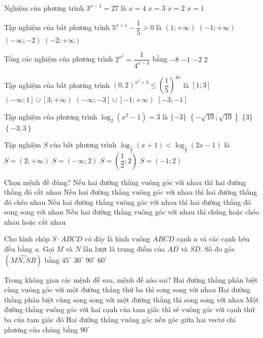 \begin{ex}
Nghiệm của phương trình ${3^{x-1}}=27$ là
\choice
{$x=4$}
{$x=3$}
{$x=2$}
{$x=1$}
\end{ex}
\begin{ex}
Tập nghiệm của bất phương trình ${5^{x+1}}-\dfrac{1}{5}>0$ là
\choice
{$\left(1;+\infty\right)$}
{$\left(-1;+\infty\right)$}
{$\left(-\infty ;-2\right)$}
{$\left(-2;+\infty\right)$}
\end{ex}
\begin{ex}
Tổng các nghiệm của phương trình ${2^{x^2}}=\dfrac{1}{{4^{x-4}}}$ bằng
\choice
{$-8$}
{$-1$}
{$-2$}
{$2$}
\end{ex}
\begin{ex}
Tập nghiệm của bất phương trình ${{\left(0{,}2\right)}^{x^2+3}}\le {{\left(\dfrac{1}{5}\right)}^{4x}}$ là
\choice
{$[1;3]$}
{$\left(-\infty ;1\right]\cup \left[3;+\infty\right)$}
{$\left(-\infty ;-3\right]\cup \left[-1;+\infty\right)$}
{$[-3;-1]$}
\end{ex}
\begin{ex}
Tập nghiệm của phương trình $\log _2\left(x^2-1\right)=3$ là
	\choice
	{$\{-3\}$}
	{$\left\{ -\sqrt{10};\sqrt{10} \right\}$}
	{$\{3\}$}
	{$\left\{ -3;3 \right\}$}
\end{ex}
\begin{ex}
	Tập nghiệm ${S}$ của bất phương trình $\log_{\tfrac{1}{2}}(x+1)<{{\log }_{\tfrac{1}{2}}}(2x-1)$ là
	\choice
	{$S=\left(2;+\infty\right)$}
	{$S=\left(-\infty ;2\right)$}
	{$S=\left(\dfrac{1}{2};2\right)$}
	{$S=(-1;2)$}
\end{ex}
\begin{ex}
Chọn mệnh đề đúng?
\choice
{Nếu hai đường thẳng vuông góc với nhau thì hai đường thẳng đó cắt nhau}
{Nếu hai đường thẳng vuông góc với nhau thì hai đường thẳng đó chéo nhau}
{Nếu hai đường thẳng vuông góc với nhau thì hai đường thẳng đó song song với nhau}
{Nếu hai đường thẳng vuông góc với nhau thì chúng hoặc chéo nhau hoặc cắt nhau}
\end{ex}
\begin{ex}
Cho hình chóp $S \cdot ABCD$ có đáy là hình vuông $ABCD$ cạnh $a$ và các cạnh bên đều bằng $a$. Gọi $M$ và $N$ lần lượt là trung điểm của $AD$ và $SD$. Số đo góc $\left(\widehat{MN,SB}\right)$ bằng
\choice
{$45^\circ $}
{$30^\circ $}
{$90^\circ $}
{$60^\circ $}
\end{ex}
\begin{ex}
Trong không gian các mệnh đề sau, mệnh đề nào sai?
\choice
{Hai đường thẳng phân biệt cùng vuông góc với một đường thẳng thứ ba thì song song với nhau}
{Hai đường thẳng phân biệt cùng song song với một đường thẳng thì song song với nhau}
{Một đường thẳng vuông góc với hai cạnh của tam giác thì sẽ vuông góc với cạnh thứ ba của tam giác đó}
{Hai đường thẳng vuông góc nếu góc giữa hai vectơ chỉ phương của chúng bằng $90^\circ $}
\end{ex}
